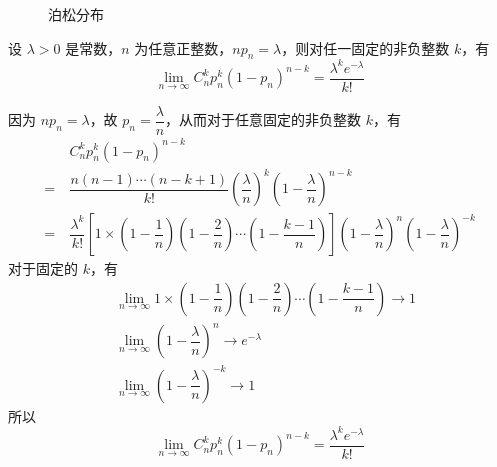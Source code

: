 \begin{figure}[htbp]
    \centering


    \caption{泊松分布}
\end{figure}

\begin{theorem}[(泊松定理)]
    设 $\lambda > 0$ 是常数，$n$ 为任意正整数，$n p_n=\lambda$，则对任一固定的非负整数 $k$，有
    $$
    \lim_{n\to\infty} C_n^k p_n^k (1-p_n)^{n-k} = \dfrac{\lambda^k e^{-\lambda}}{k!}
    $$
\end{theorem}

\begin{myproof}
    因为 $n p_n=\lambda$，故 $p_n=\dfrac{\lambda}{n}$，从而对于任意固定的非负整数 $k$，有
    $$
    \begin{aligned}
        & C_n^k p_n^k (1-p_n)^{n-k}\\
        =\ & \dfrac{n(n-1) \cdots (n-k+1)}{k!} \left( \dfrac{\lambda}{n} \right)^k \left( 1-\dfrac{\lambda}{n} \right)^{n-k}\\
        =\ & \dfrac{\lambda^k}{k!} \left[ 1 \times \left( 1-\dfrac{1}{n} \right) \left( 1-\dfrac{2}{n} \right) \cdots \left( 1-\dfrac{k-1}{n} \right) \right] \left( 1-\dfrac{\lambda}{n} \right)^n \left( 1-\dfrac{\lambda}{n} \right)^{-k}
    \end{aligned}
    $$
    对于固定的 $k$，有
    $$
    \begin{aligned}
        & \lim_{n \to \infty} 1 \times \left( 1-\dfrac{1}{n} \right) \left( 1-\dfrac{2}{n} \right) \cdots \left( 1-\dfrac{k-1}{n} \right) \to 1 \\
        & \lim_{n \to \infty} \left( 1-\dfrac{\lambda}{n} \right)^n \to e^{-\lambda} \\
        & \lim_{n \to \infty} \left( 1-\dfrac{\lambda}{n} \right)^{-k}\to 1
    \end{aligned}
    $$
    所以
    $$
    \lim_{n\to\infty} C_n^k p_n^k (1-p_n)^{n-k} = \dfrac{\lambda^k e^{-\lambda}}{k!}
    $$
\end{myproof}

